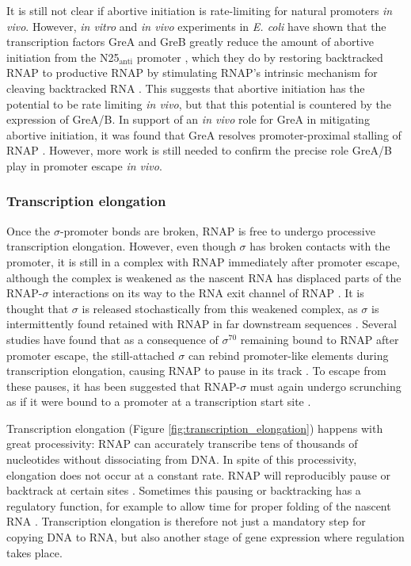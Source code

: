 It is still not clear if abortive initiation is rate-limiting for natural
promoters \textit{in vivo}. However, \textit{in vitro} and \textit{in vivo}
experiments in \textit{E. coli} have shown that the transcription factors GreA
and GreB greatly reduce the amount of abortive initiation from the
N25$_{\text{anti}}$ promoter \cite{hsu_escherichia_1995}, which they do by
restoring backtracked RNAP to productive RNAP by stimulating RNAP's intrinsic
mechanism for cleaving backtracked RNA \cite{hsu_initial_2006,
toulme_grea_2000}. This suggests that abortive initiation has the potential to
be rate limiting \textit{in vivo}, but that this potential is countered by the
expression of GreA/B. In support of an \textit{in vivo} role for GreA in
mitigating abortive initiation, it was found that GreA resolves
promoter-proximal stalling of RNAP \cite{kusuya_transcription_2011}. However,
more work is still needed to confirm the precise role GreA/B play in promoter
escape \textit{in vivo}.

\subsubsection{Transcription elongation}
Once the $\sigma$-promoter bonds are broken, RNAP is free to undergo
processive transcription elongation. However, even though $\sigma$ has broken
contacts with the promoter, it is still in a complex with RNAP immediately
after promoter escape, although the complex is weakened as the nascent RNA has
displaced parts of the RNAP-$\sigma$ interactions on its way to the RNA exit
channel of RNAP \cite{mekler_structural_2002, nickels_interaction_2005}. It is
thought that $\sigma$ is released stochastically from this weakened complex,
as $\sigma$ is intermittently found retained with RNAP in far downstream
sequences \cite{mooney_sigma_2005}. Several studies have found that as a
consequence of $\sigma^{70}$ remaining bound to RNAP after promoter escape,
the still-attached $\sigma$ can rebind promoter-like elements during
transcription elongation, causing RNAP to pause in its track
\cite{ring_function_1996, kapanidis_retention_2005,
raffaelle_holoenzyme_2005}. To escape from these pauses, it has been suggested
that RNAP-$\sigma$ must again undergo scrunching as if it were bound to a
promoter at a transcription start site \cite{zhilina_structural_2012}.
\label{sigma_rebinding}

Transcription elongation (Figure \ref{fig:transcription_elongation}) happens
with great processivity: RNAP can accurately transcribe tens of thousands of
nucleotides without dissociating from DNA. In spite of this processivity,
elongation does not occur at a constant rate. RNAP will reproducibly pause or
backtrack at certain sites \cite{herbert_sequence-resolved_2006}. Sometimes
this pausing or backtracking has a regulatory function, for example to allow
time for proper folding of the nascent RNA \cite{landick_regulatory_2006}.
Transcription elongation is therefore not just a mandatory step for copying DNA
to RNA, but also another stage of gene expression where regulation takes place.

